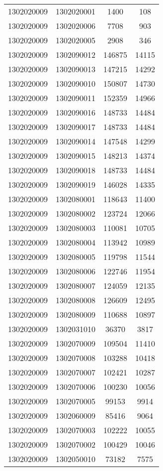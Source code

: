 \begin{longtable}{llcc}
1302020009 & 1302020001 & 1400 & 108\\
1302020009 & 1302020006 & 7708 & 903\\
1302020009 & 1302020005 & 2908 & 346\\
1302020009 & 1302090012 & 146875 & 14115\\
1302020009 & 1302090013 & 147215 & 14292\\
1302020009 & 1302090010 & 150807 & 14730\\
1302020009 & 1302090011 & 152359 & 14966\\
1302020009 & 1302090016 & 148733 & 14484\\
1302020009 & 1302090017 & 148733 & 14484\\
1302020009 & 1302090014 & 147548 & 14299\\
1302020009 & 1302090015 & 148213 & 14374\\
1302020009 & 1302090018 & 148733 & 14484\\
1302020009 & 1302090019 & 146028 & 14335\\
1302020009 & 1302080001 & 118643 & 11400\\
1302020009 & 1302080002 & 123724 & 12066\\
1302020009 & 1302080003 & 110081 & 10705\\
1302020009 & 1302080004 & 113942 & 10989\\
1302020009 & 1302080005 & 119798 & 11544\\
1302020009 & 1302080006 & 122746 & 11954\\
1302020009 & 1302080007 & 124059 & 12135\\
1302020009 & 1302080008 & 126609 & 12495\\
1302020009 & 1302080009 & 110688 & 10897\\
1302020009 & 1302031010 & 36370 & 3817\\
1302020009 & 1302070009 & 109504 & 11410\\
1302020009 & 1302070008 & 103288 & 10418\\
1302020009 & 1302070007 & 102421 & 10287\\
1302020009 & 1302070006 & 100230 & 10056\\
1302020009 & 1302070005 & 99153 & 9914\\
1302020009 & 1302060009 & 85416 & 9064\\
1302020009 & 1302070003 & 102222 & 10055\\
1302020009 & 1302070002 & 100429 & 10046\\
1302020009 & 1302050010 & 73182 & 7575\\

\end{longtable}
